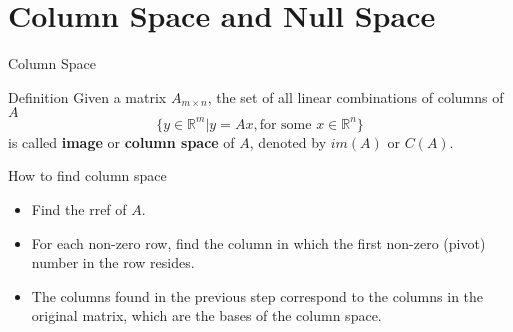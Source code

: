 \documentclass{beamer}
\begin{document}
\section{Column Space and Null Space}    
\begin{frame}[label=4]{Column Space} 
    \begin{block}{Definition}
        Given a matrix $A_{m\times n}$, the set of all linear combinations of columns of $A$
        \begin{equation*}
            \{y\in\mathbb{R}^m|y=Ax, \text{for some } x\in\mathbb{R}^n\}
        \end{equation*}
        is called \textbf{image} or \textbf{column space} of $A$, denoted by $im(A)$ or $C(A)$.
    \end{block}
    \begin{block}{How to find column space}
        \begin{itemize}
            \item Find the rref of $A$.
            \item For each non-zero row, find the column in which the first non-zero (pivot) number in the row resides.
            \item The columns found in the previous step correspond to the columns in the original matrix, which are the bases of the column space.
        \end{itemize}
    \end{block}
\end{frame}
\end{document}
